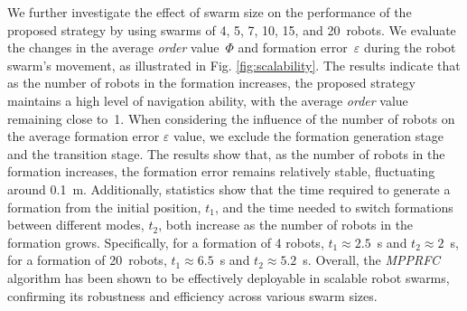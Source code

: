 We further investigate the effect of swarm size on the performance of the proposed strategy by using swarms of 4, 5, 7, 10, 15, and 20~robots. We evaluate the changes in the average \textit{order} value~$\Phi$ and formation error~$\varepsilon$ during the robot swarm's movement, as illustrated in Fig. \ref{fig:scalability}. The results indicate that as the number of robots in the formation increases, the proposed strategy maintains a high level of navigation ability, with the average \textit{order} value remaining close to~1. When considering the influence of the number of robots on the average formation error $\varepsilon$ value, we exclude the formation generation stage and the transition stage. The results show that, as the number of robots in the formation increases, the formation error remains relatively stable, fluctuating around 0.1~m. Additionally, statistics show that the time required to generate a formation from the initial position, $t_1$, and the time needed to switch formations between different modes, $t_2$, both increase as the number of robots in the formation grows. Specifically, for a formation of 4 robots, $t_1 \approx 2.5$~s and $t_2 \approx 2$~s, for a formation of 20~robots, $t_1\approx6.5$~s and $t_2\approx5.2$~s. Overall, the \textit{MPPRFC} algorithm has been shown to be effectively deployable in scalable robot swarms, confirming its robustness and efficiency across various swarm sizes.

